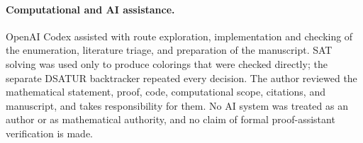 \documentclass[11pt]{article}
\begin{document}
\paragraph{Computational and AI assistance.}
OpenAI Codex assisted with route exploration, implementation and checking of
the enumeration, literature triage, and preparation of the manuscript.  SAT
solving was used only to produce colorings that were checked directly; the
separate DSATUR backtracker repeated every decision.  The author reviewed the
mathematical statement, proof, code, computational scope, citations, and
manuscript, and takes responsibility for them.  No AI system was treated as
an author or as mathematical authority, and no claim of formal proof-assistant
verification is made.



\end{document}
